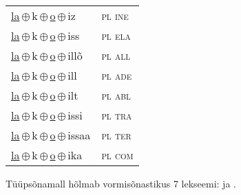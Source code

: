 \begin{minipage}{\textwidth}
\begin{sideways}
\begin{tabular}{l l}
\underline{la}\,$\oplus$\,k\,$\oplus$\,\underline{o}\,$\oplus$\,iz & \textsc{ pl ine } \\
\underline{la}\,$\oplus$\,k\,$\oplus$\,\underline{o}\,$\oplus$\,iss & \textsc{ pl ela } \\
\underline{la}\,$\oplus$\,k\,$\oplus$\,\underline{o}\,$\oplus$\,illõ & \textsc{ pl all } \\
\underline{la}\,$\oplus$\,k\,$\oplus$\,\underline{o}\,$\oplus$\,ill & \textsc{ pl ade } \\
\underline{la}\,$\oplus$\,k\,$\oplus$\,\underline{o}\,$\oplus$\,ilt & \textsc{ pl abl } \\
\underline{la}\,$\oplus$\,k\,$\oplus$\,\underline{o}\,$\oplus$\,issi & \textsc{ pl tra } \\
\underline{la}\,$\oplus$\,k\,$\oplus$\,\underline{o}\,$\oplus$\,issaa & \textsc{ pl ter } \\
\underline{la}\,$\oplus$\,k\,$\oplus$\,\underline{o}\,$\oplus$\,ika & \textsc{ pl com } \\
\end{tabular}
\end{sideways}
\label{tab:tüüpsõnamall-lako}

\end{minipage}

 
\vspace{1em}
\noindent Tüüpsõnamall  hõlmab vormisõnastikus 7 lekseemi:  ja .
